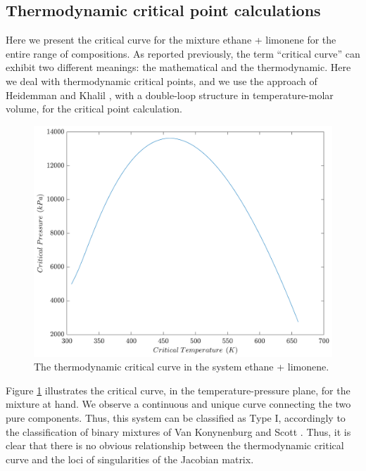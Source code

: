 \documentclass[journal=iecred,manuscript=article]{achemso}
\theoremstyle{definition}
\theoremstyle{remark}
\begin{document}
\subsection{Thermodynamic critical point calculations}

Here we present the critical curve for the mixture ethane + limonene for the entire range of compositions. As reported previously, the term \enquote{critical curve} can exhibit two different meanings: the mathematical  and the thermodynamic.
 Here we deal
 with thermodynamic critical points, and we use the approach of Heidemman and Khalil \citep{heidemman}, with a double-loop structure in temperature-molar volume, for the critical point calculation.
 
\begin{figure}
	\begin{center}
		\includegraphics[scale=0.50]{temperatura_pressao.pdf}
		\caption{The thermodynamic critical curve in the system ethane + limonene.}\label{fig:critical_thermo}
	\end{center}
\end{figure}

Figure \ref{fig:critical_thermo} illustrates the critical curve, in the temperature-pressure plane, for the mixture at hand. We observe a continuous and unique curve connecting the two pure components. Thus, this system can be classified as Type I, accordingly to the classification of binary mixtures of Van Konynenburg and Scott \cite{classif}. Thus, it is clear that there is no obvious relationship between the thermodynamic critical curve and the loci of singularities of the Jacobian matrix.
\end{document}
